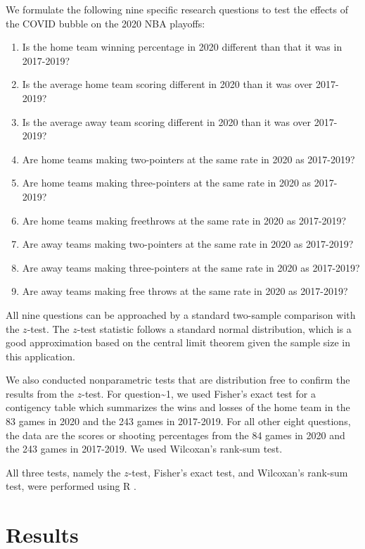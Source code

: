 \documentclass[12pt, letterpaper, titlepage]{article}
\begin{document}
We formulate the following nine specific research questions to test
the effects of the COVID bubble on the 2020 NBA playoffs:

\begin{enumerate}
\def\labelenumi{\arabic{enumi}.}
\item
  Is the home team winning percentage in 2020 different than that it was in 2017-2019?
\item
  Is the average home team scoring different in 2020 than it was over 2017-2019?
\item
  Is the average away team scoring different in 2020 than it was over 2017-2019?
\item
  Are home teams making two-pointers at the same rate in 2020 as 2017-2019?
\item
  Are home teams making three-pointers at the same rate in 2020 as 2017-2019?
\item
  Are home teams making freethrows at the same rate in 2020 as 2017-2019?
\item
  Are away teams making two-pointers at the same rate in 2020 as 2017-2019?
\item
  Are away teams making three-pointers at the same rate in 2020 as 2017-2019?
\item
  Are away teams making free throws at the same rate in 2020 as 2017-2019?
\end{enumerate}

All nine questions can be approached by a standard two-sample
comparison with the \(z\)-test. The \(z\)-test statistic follows a
standard normal distribution, which is a good approximation based on
the central limit theorem given the sample size in this application.

We also conducted nonparametric tests that are distribution free to
confirm the results from the \(z\)-test. For question\textasciitilde1, we used
Fisher's exact test for a contigency table which summarizes the wins
and losses of the home team in the 83 games in 2020 and the 243 games
in 2017-2019. For all other eight questions, the data are the scores
or shooting percentages from the 84 games in 2020 and the 243 games in
2017-2019. We used Wilcoxan's rank-sum test.

All three tests, namely the \(z\)-test, Fisher's exact test, and
Wilcoxan's rank-sum test, were performed using R \citep{R}.

\hypertarget{sec:results}{%
\section{Results}\label{sec:results}}
\end{document}
